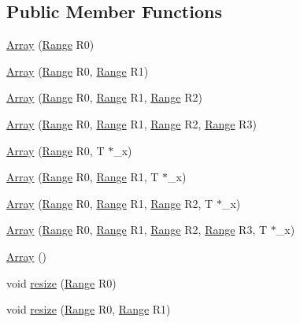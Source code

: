 \subsection*{Public Member Functions}
\begin{DoxyCompactItemize}
\item 
\hyperlink{classArrays_1_1Array_a2164078d88153caacc1fc5540a48bf77}{Array} (\hyperlink{structArrays_1_1Range}{Range} R0)
\item 
\hyperlink{classArrays_1_1Array_abbb516f38784b76405bed6040f3cb144}{Array} (\hyperlink{structArrays_1_1Range}{Range} R0, \hyperlink{structArrays_1_1Range}{Range} R1)
\item 
\hyperlink{classArrays_1_1Array_a6f81a716a1d38c2fc428498c39f25a09}{Array} (\hyperlink{structArrays_1_1Range}{Range} R0, \hyperlink{structArrays_1_1Range}{Range} R1, \hyperlink{structArrays_1_1Range}{Range} R2)
\item 
\hyperlink{classArrays_1_1Array_a5d6aa458b4495d20e7a8acef4b6d73de}{Array} (\hyperlink{structArrays_1_1Range}{Range} R0, \hyperlink{structArrays_1_1Range}{Range} R1, \hyperlink{structArrays_1_1Range}{Range} R2, \hyperlink{structArrays_1_1Range}{Range} R3)
\item 
\hyperlink{classArrays_1_1Array_a70439f109ed5f64a8f35c25cb4b24c40}{Array} (\hyperlink{structArrays_1_1Range}{Range} R0, T $\ast$\+\_\+x)
\item 
\hyperlink{classArrays_1_1Array_ae5bd30d2d751a0235ecacbf2a4ce3924}{Array} (\hyperlink{structArrays_1_1Range}{Range} R0, \hyperlink{structArrays_1_1Range}{Range} R1, T $\ast$\+\_\+x)
\item 
\hyperlink{classArrays_1_1Array_a1189445709f97dad6f514608aff958c8}{Array} (\hyperlink{structArrays_1_1Range}{Range} R0, \hyperlink{structArrays_1_1Range}{Range} R1, \hyperlink{structArrays_1_1Range}{Range} R2, T $\ast$\+\_\+x)
\item 
\hyperlink{classArrays_1_1Array_aab79bc0c5a2db560a1fbe732c4dff037}{Array} (\hyperlink{structArrays_1_1Range}{Range} R0, \hyperlink{structArrays_1_1Range}{Range} R1, \hyperlink{structArrays_1_1Range}{Range} R2, \hyperlink{structArrays_1_1Range}{Range} R3, T $\ast$\+\_\+x)
\item 
\hyperlink{classArrays_1_1Array_ada9c0912ce5139c9b79007764e5b3ca4}{Array} ()
\item 
void \hyperlink{classArrays_1_1Array_ae6838404da6e00d2d2a0f4e1397c2ab5}{resize} (\hyperlink{structArrays_1_1Range}{Range} R0)
\item 
void \hyperlink{classArrays_1_1Array_acc8e3f697c23e21e4cd30388c0b0bfaa}{resize} (\hyperlink{structArrays_1_1Range}{Range} R0, \hyperlink{structArrays_1_1Range}{Range} R1)

\end{DoxyCompactItemize}
